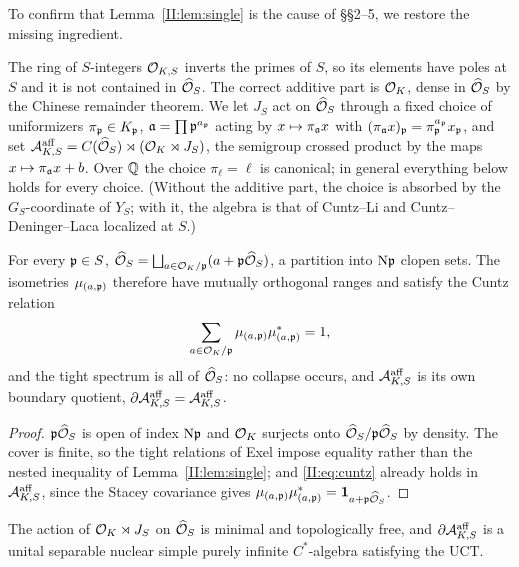 To confirm that Lemma~\ref{II:lem:single} is the cause of \S\S2--5, we restore the missing
ingredient.

\begin{remark}\label{II:rem:additive}
The ring of $S$-integers $\mathcal{O}_{K,S}$ inverts the primes of $S$, so its elements have poles
at $S$ and it is not contained in $\widehat{\mathcal{O}}_S$. The correct additive part is $\mathcal{O}_K$, dense in
$\widehat{\mathcal{O}}_S$ by the Chinese remainder theorem. We let $J_S$ act on $\widehat{\mathcal{O}}_S$ through a fixed choice
of uniformizers $\pi_{\mathfrak{p}}\in K_{\mathfrak{p}}$, $\mathfrak{a}=\prod\mathfrak{p}^{a_{\mathfrak{p}}}$ acting by
$x\mapsto\pi_{\mathfrak{a}} x$ with $(\pi_{\mathfrak{a}} x)_{\mathfrak{p}}=\pi_{\mathfrak{p}}^{a_{\mathfrak{p}}}x_{\mathfrak{p}}$, and set
$\mathcal{A}^{\mathrm{aff}}_{K,S}=C(\widehat{\mathcal{O}}_S)\rtimes(\mathcal{O}_K\rtimes J_S)$, the semigroup crossed product
by the maps $x\mapsto\pi_{\mathfrak{a}} x+b$. Over $\mathbb{Q}$ the choice $\pi_\ell=\ell$ is canonical; in
general everything below holds for every choice. (Without the additive part, the choice is
absorbed by the $G_S$-coordinate of $Y_S$; with it, the algebra is that of Cuntz--Li
\cite{CL} and Cuntz--Deninger--Laca \cite{CDL} localized at $S$.)
\end{remark}

\begin{lemma}\label{II:lem:cover}
For every $\mathfrak{p}\in S$, $\widehat{\mathcal{O}}_S=\bigsqcup_{a\in\mathcal{O}_K/\mathfrak{p}}(a+\mathfrak{p}\widehat{\mathcal{O}}_S)$, a partition into
$\mathrm{N}\mathfrak{p}$ clopen sets. The isometries $\mu_{(a,\mathfrak{p})}$ therefore have mutually orthogonal
ranges and satisfy the Cuntz relation
\begin{equation}\label{II:eq:cuntz}
\sum_{a\in\mathcal{O}_K/\mathfrak{p}}\mu_{(a,\mathfrak{p})}\mu_{(a,\mathfrak{p})}^*=1 ,
\end{equation}
and the tight spectrum is all of $\widehat{\mathcal{O}}_S$: no collapse occurs, and
$\mathcal{A}^{\mathrm{aff}}_{K,S}$ is its own boundary quotient, $\partial\mathcal{A}^{\mathrm{aff}}_{K,S}=\mathcal{A}^{\mathrm{aff}}_{K,S}$.
\end{lemma}

\begin{proof}
$\mathfrak{p}\widehat{\mathcal{O}}_S$ is open of index $\mathrm{N}\mathfrak{p}$ and $\mathcal{O}_K$ surjects onto $\widehat{\mathcal{O}}_S/\mathfrak{p}\widehat{\mathcal{O}}_S$ by density.
The cover is finite, so the tight relations of Exel \cite{Exel} impose equality rather
than the nested inequality of Lemma~\ref{II:lem:single}; and \eqref{II:eq:cuntz} already holds in
$\mathcal{A}^{\mathrm{aff}}_{K,S}$, since the Stacey covariance gives
$\mu_{(a,\mathfrak{p})}\mu_{(a,\mathfrak{p})}^*=\mathbf 1_{a+\mathfrak{p}\widehat{\mathcal{O}}_S}$.
\end{proof}

\begin{theorem}\label{II:thm:kirchberg}
The action of $\mathcal{O}_K\rtimes J_S$ on $\widehat{\mathcal{O}}_S$ is minimal and topologically free, and
$\partial\mathcal{A}^{\mathrm{aff}}_{K,S}$ is a unital separable nuclear simple purely infinite
$C^*$-algebra satisfying the UCT.
\end{theorem}


